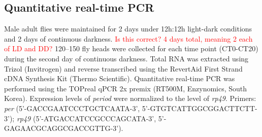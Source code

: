 \subsection*{Quantitative real-time PCR}

Male adult flies were maintained for 2 days under 12h:12h light-dark conditions and 2 days of continuous darkness. \textcolor{red}{Is this correct? 4 days total, meaning 2 each of LD and DD?}
120--150 fly heads were collected for each time point (CT0-CT20) during the second day of continuous darkness.
Total RNA was extracted using Trizol (Invitrogen) and reverse transcribed using the RevertAid First Strand cDNA Synthesis Kit (Thermo Scientific).
Quantitative real-time PCR was performed using the TOPreal qPCR 2x premix (RT500M, Enzynomics, South Korea).
Expression levels of \emph{period} were normalized to the level of \emph{rp49}.
Primers: \emph{per} (5'-GACCGAATCCCTGCTCAATA-3', 5'-GTGTCATTGGCGGACTTCTT-3'); \emph{rp49} (5'-ATGACCATCCGCCCAGCATA-3', 5'-GAGAACGCAGGCGACCGTTG-3').